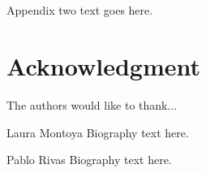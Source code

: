 \documentclass[conference]{IEEEtran}
\begin{document}
\section{}
Appendix two text goes here.


\section*{Acknowledgment}


The authors would like to thank...






\begin{IEEEbiography}{Laura Montoya}
Biography text here.
\end{IEEEbiography}

\begin{IEEEbiography}{Pablo Rivas}
Biography text here.
\end{IEEEbiography}
\end{document}
